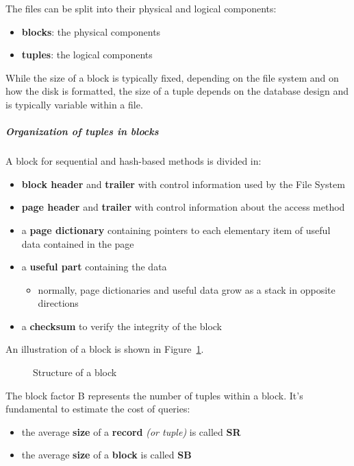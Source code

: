 \documentclass[english]{article}
\begin{document}
The files can be split into their physical and logical components:

\begin{itemize}
  \item \textbf{blocks}: the physical components
  \item \textbf{tuples}: the logical components
\end{itemize}

While the size of a block is typically fixed, depending on the file system and on how the disk is formatted, the size of a tuple depends on the database design and is typically variable within a file.

\subparagraph*{Organization of tuples in blocks}

A block for sequential and hash-based methods is divided in:

\begin{itemize}
  \item \textbf{block header} and \textbf{trailer} with control information used by the File System
  \item \textbf{page header} and \textbf{trailer} with control information about the access method
  \item a \textbf{page dictionary} containing pointers to each elementary item of useful data contained in the page
  \item a \textbf{useful part} containing the data
        \begin{itemize}
          \item normally, page dictionaries and useful data grow as a stack in opposite directions
        \end{itemize}
  \item a \textbf{checksum} to verify the integrity of the block
\end{itemize}

An illustration of a block is shown in Figure~\ref{fig:block-structure}.

\begin{figure}[htbp]
  \centering
  \bigskip
  \caption{Structure of a block}
  \label{fig:block-structure}
  \bigskip
\end{figure}

\bigskip
The block factor B represents the number of tuples within a block.
It's fundamental to estimate the cost of queries:

\begin{itemize}
  \item the average \textbf{size} of a \textbf{record} \textit{(or tuple)} is called \textbf{SR}
  \item the average \textbf{size} of a \textbf{block} is called \textbf{SB}
\end{itemize}
\end{document}
